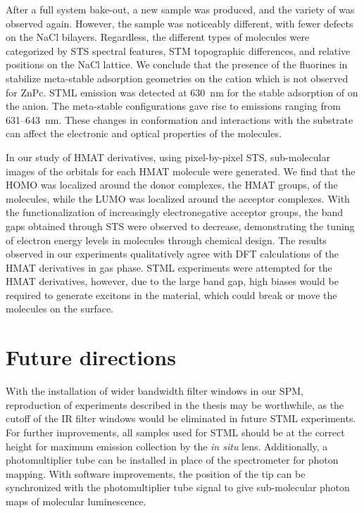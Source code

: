 After a full system bake-out, a new sample was produced, and the variety of  was observed again. However, the sample was noticeably different, with fewer defects on the NaCl bilayers. Regardless, the different types of molecules were categorized by \ac{STS} spectral features, \ac{STM} topographic differences, and relative positions on the NaCl lattice. We conclude that the presence of the fluorines in  stabilize meta-stable adsorption geometries on the  cation which is not observed for ZnPc. \ac{STML} emission was detected at \SI{630}{nm} for the stable adsorption of  on the  anion. The meta-stable configurations gave rise to emissions ranging from 631--\SI{643}{nm}. These changes in conformation and interactions with the substrate can affect the electronic and optical properties of the molecules.

In our study of HMAT derivatives, using pixel-by-pixel \ac{STS}, sub-molecular images of the orbitals for each HMAT molecule were generated. We find that the HOMO was localized around the donor complexes, the HMAT groups, of the molecules, while the LUMO was localized around the acceptor complexes. With the functionalization of increasingly electronegative acceptor groups, the band gaps obtained through \ac{STS} were observed to decrease, demonstrating the tuning of electron energy levels in molecules through chemical design. The results observed in our experiments qualitatively agree with DFT calculations of the HMAT derivatives in gas phase. \ac{STML} experiments were attempted for the HMAT derivatives, however, due to the large band gap, high biases would be required to generate excitons in the material, which could break or move the molecules on the surface.




\section{Future directions}

With the installation of wider bandwidth filter windows in our \ac{SPM}, reproduction of experiments described in the thesis may be worthwhile, as the cutoff of the IR filter windows would be eliminated in future \ac{STML} experiments. For further improvements, all samples used for \ac{STML} should be at the correct height for maximum emission collection by the \textit{in situ} lens. Additionally, a photomultiplier tube can be installed in place of the spectrometer for photon mapping. With software improvements, the position of the tip can be synchronized with the photomultiplier tube signal to give sub-molecular photon maps of molecular luminescence.

